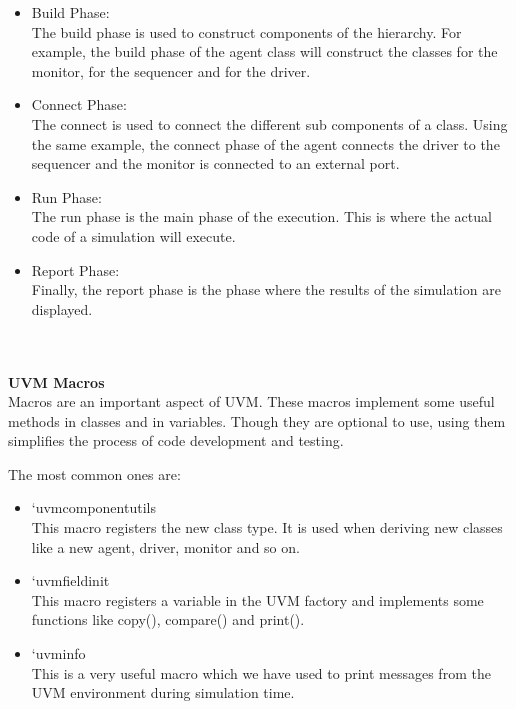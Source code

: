 \documentclass[a4paper,11pt]{article}
\begin{document}
\begin{itemize}

\item Build Phase:
\ \\
The build phase is used to construct components of the hierarchy. For example, the build phase of the agent class will construct the classes for the monitor, for the sequencer and for the driver.

\item Connect Phase:
\ \\
The connect is used to connect the different sub components of a class. Using the same example, the connect phase of the agent connects the driver to the sequencer and the monitor is connected to an external port.

\item Run Phase:
\ \\
The run phase is the main phase of the execution. This is where the actual code of a simulation will execute.

\item Report Phase:
\ \\
Finally, the report phase is the phase where the results of the simulation are displayed.

\end{itemize}
\ \\
\ \\
\textbf{UVM Macros}
\ \\
Macros are an important aspect of UVM. These macros implement some useful methods in classes and in variables. Though they are optional to use, using them simplifies the process of code development and testing.

The most common ones are:
\begin{itemize}

\item `uvm\textunderscore component\textunderscore utils
\ \\
This macro registers the new class type. It is used when deriving new classes like a new agent, driver, monitor and so on.

\item `uvm\textunderscore field\textunderscore init
\ \\
This macro registers a variable in the UVM factory and implements some functions like copy(), compare() and print().

\item `uvm\textunderscore info
\ \\
This is a very useful macro which we have used to print messages from the UVM environment during simulation time.


\end{itemize}
\end{document}
